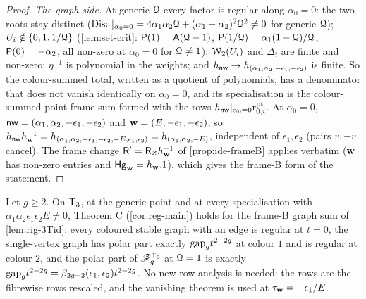 \begin{proof}
\emph{The graph side.} At generic $\mathcal{Q}$ every factor is regular along $\alpha_0=0$: the two roots stay distinct ($\operatorname{Disc}|_{\alpha_0=0}=4\alpha_1\alpha_2\mathcal{Q}+(\alpha_1-\alpha_2)^2\mathcal{Q}^2\neq 0$ for generic $\mathcal{Q}$); $U_i\notin\{0,1,1/\mathcal{Q}\}$ (\cref{lem:set-crit}: $\mathsf{P}(1)=\mathsf{A}(\mathcal{Q}-1)$, $\mathsf{P}(1/\mathcal{Q})=\alpha_1(1-\mathcal{Q})/\mathcal{Q}$, $\mathsf{P}(0)=-\alpha_2$, all non-zero at $\alpha_0=0$ for $\mathcal{Q}\neq 1$); $\mathcal{W}_2(U_i)$ and $\Delta_i$ are finite and non-zero; $\eta^{-1}$ is polynomial in the weights; and $h_{\mathsf{nw}}\to h_{(\alpha_1,\alpha_2,-\epsilon_1,-\epsilon_2)}$ is finite. So the colour-summed total, written as a quotient of polynomials, has a denominator that does not vanish identically on $\alpha_0=0$, and its specialisation is the colour-summed point-frame sum formed with the rows $h_{\mathsf{nw}}|_{\alpha_0=0}\mathrm{r}^{\mathrm{pt}}_{0,i}$. At $\alpha_0=0$, $\mathsf{nw}=(\alpha_1,\alpha_2,-\epsilon_1,-\epsilon_2)$ and $\mathbf{w}=(E,-\epsilon_1,-\epsilon_2)$, so $h_{\mathsf{nw}}h_{\mathbf{w}}^{-1}=h_{(\alpha_1,\alpha_2,-\epsilon_1,-\epsilon_2,-E,\epsilon_1,\epsilon_2)}=h_{(\alpha_1,\alpha_2,-E)}$, independent of $\epsilon_1,\epsilon_2$ (pairs $v,-v$ cancel). The frame change $\mathsf{R}'=\mathsf{R}_{Z}h_{\mathbf{w}}^{-1}$ of \cref{prop:ide-frameB} applies verbatim ($\mathbf{w}$ has non-zero entries and $\mathsf{Hg}_{\mathbf{w}}=h_{\mathbf{w}}.1$), which gives the frame-B form of the statement.
\end{proof}

\begin{cor}
\label{cor:rig-3T}
Let $g\geq 2$. On $\mathsf{T}_{3}$, at the generic point and at every specialisation with $\alpha_1\alpha_2\epsilon_1\epsilon_2E\neq 0$, Theorem C (\cref{cor:reg-main}) holds for the frame-B graph sum of \cref{lem:rig-3Tid}: every coloured stable graph with an edge is regular at $t=0$, the single-vertex graph has polar part exactly $\mathrm{gap}_g t^{2-2g}$ at colour $1$ and is regular at colour $2$, and the polar part of $\mathscr{F}^{\mathsf{T}_{3}}_g$ at $\mathcal{Q}=1$ is exactly $\mathrm{gap}_g t^{2-2g}=\beta_{2g-2}(\epsilon_1,\epsilon_2)t^{2-2g}$. No new row analysis is needed: the rows are the fibrewise rows rescaled, and the vanishing theorem is used at $\tau_{\mathbf{w}}=-\epsilon_1/E$.
\end{cor}

